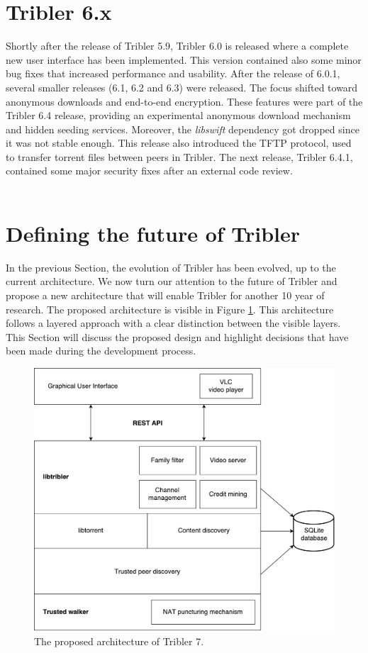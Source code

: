 \section{Tribler 6.x}
Shortly after the release of Tribler 5.9, Tribler 6.0 is released where a complete new user interface has been implemented. This version contained also some minor bug fixes that increased performance and usability. After the release of 6.0.1, several smaller releases (6.1, 6.2 and 6.3) were released. The focus shifted toward anonymous downloads and end-to-end encryption. These features were part of the Tribler 6.4 release, providing an experimental anonymous download mechanism and hidden seeding services. Moreover, the \emph{libswift} dependency got dropped since it was not stable enough. This release also introduced the TFTP protocol, used to transfer torrent files between peers in Tribler. The next release, Tribler 6.4.1, contained some major security fixes after an external code review.\\\\


\section{Defining the future of Tribler}
In the previous Section, the evolution of Tribler has been evolved, up to the current architecture. We now turn our attention to the future of Tribler and propose a new architecture that will enable Tribler for another 10 year of research. The proposed architecture is visible in Figure \ref{fig:tribler7}. This architecture follows a layered approach with a clear distinction between the visible layers. This Section will discuss the proposed design and highlight decisions that have been made during the development process.

\begin{figure}[h!]
	\centering
	\includegraphics[width=0.7\columnwidth]{images/architecture/tribler7}
	\caption{The proposed architecture of Tribler 7.}
	\label{fig:tribler7}
\end{figure}

